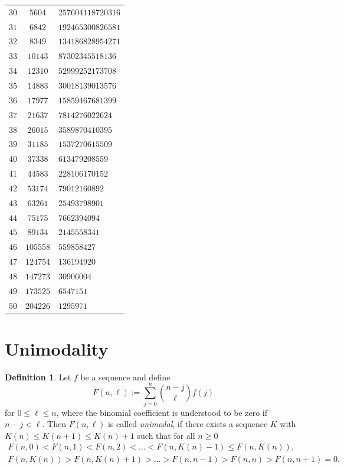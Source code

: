 \documentclass[12pt]{amsart}
\theoremstyle{definition}
\newtheorem{defi}[thm]{Definition}
\theoremstyle{remark}
\newcommand{\ph}{\phantom{0000}}
\begin{document}
\begin{center}
\begin{tabular}{|c|c|l|}
$30$ & $5604$   & \ph $257604118720316$  \\
$31$ & $6842$   & \ph $192465300826581$  \\
$32$ & $8349$   & \ph $134186828954271$  \\
$33$ & $10143$   & \ph $87302345518136$  \\
$34$ & $12310$   & \ph $52999252173708$  \\
$35$ & $14883$   & \ph $30018139013576$  \\
$36$ & $17977$   & \ph $15859467681399$  \\
$37$ & $21637$   & \ph $7814276022624$  \\
$38$ & $26015$   & \ph $3589870410395$  \\
$39$ & $31185$   & \ph $1537270615509$  \\
$40$ & $37338$   & \ph $613479208559$  \\
$41$ & $44583$   & \ph $228106170152$  \\
$42$ & $53174$   & \ph $79012160892$  \\
$43$ & $63261$   & \ph $25493798901$  \\
$44$ & $75175$   & \ph $7662394094$  \\
$45$ & $89134$   & \ph $2145558341$  \\
$46$ & $105558$   & \ph $559858427$  \\
$47$ & $124754$   & \ph $136194920$  \\
$48$ & $147273$   & \ph $30906004$  \\
$49$ & $173525$   & \ph $6547151$  \\
$50$ & $204226$   & \ph $1295971$  \\
\hline
\end{tabular} 
\end{center}

\section{Unimodality}


\begin{defi}
Let $f$ be a sequence and define
\begin{equation*}
F(n,\ell):=\sum_{j=0}^n \binom{n-j}{\ell}f(j)
\end{equation*}
for $0\le \ell\le n$, where the binomial coefficient is understood
to be zero if $n-j<\ell$. 
Then $F(n,\ell)$ is called {\it unimodal}, if there exists a
sequence $K$ with $K(n)\le K(n+1)\le K(n)+1$ such that for
all $n\ge 0$
\begin{gather*}
F(n,0)<F(n,1)<F(n,2)<\dots <F(n,K(n)-1)\le F(n,K(n)),\\
F(n,K(n)) > F(n,K(n)+1)> \dots >F(n,n-1)>F(n,n)>F(n,n+1)=0.
\end{gather*}
\end{defi}
\end{document}
